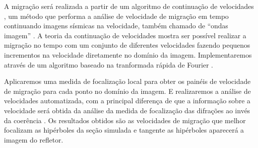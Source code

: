 A migração será realizada a partir de um algoritmo de continuação de velocidades \cite{fomel2003a}, um método que performa
a análise de velocidade de migração em tempo continuando imagens sísmicas na velocidade, também chamado de
``ondas imagem'' \cite{hubral1996}. A teoria da continuação de velocidades mostra ser possível realizar a migração no tempo
com um conjunto de diferentes velocidades fazendo pequenos incrementos na velocidade diretamente no domínio da imagem.
Implementaremos através de um algoritmo baseado na tranformada rápida de Fourier \cite{bfomel2003}.

Aplicaremos uma medida de focalização local para obter os painéis de velocidade de migração para cada ponto no domínio da
imagem. E realizaremos a análise de velocidades automatizada, com a principal diferença de que a informação sobre a velocidade
será obtida da análise da medida de focalização das difrações ao invés da coerência \cite{sep_dif}.
Os resultados obtidos são as velocidades de migração que melhor focalizam as hipérboles da seção simulada e tangente as hipérboles
aparecerá a imagem do refletor.